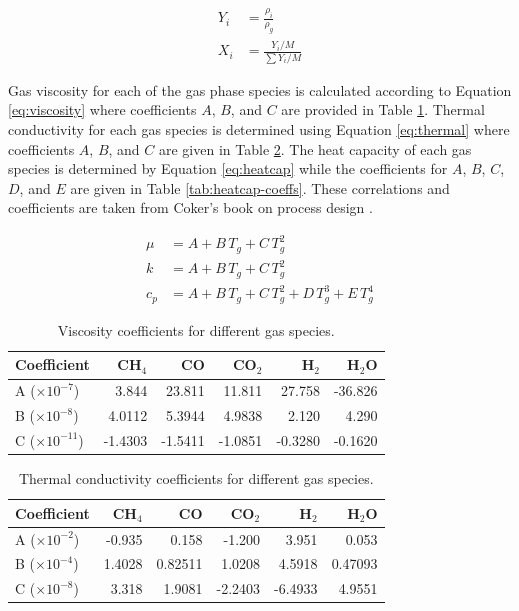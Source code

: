 \documentclass[12pt,titlepage]{article}
\begin{document}
\begin{align}
    Y_i &= \frac{\rho_i}{\rho_g} \label{eq:massfrac} \\
    X_i &= \frac{Y_i / M}{\sum Y_i / M} \label{eq:molefrac}
\end{align}

Gas viscosity for each of the gas phase species is calculated according to Equation \ref{eq:viscosity} where coefficients $A$, $B$, and $C$ are provided in Table \ref{tab:visc-coeffs}. Thermal conductivity for each gas species is determined using Equation \ref{eq:thermal} where coefficients $A$, $B$, and $C$ are given in Table \ref{tab:thermal-coeffs}. The heat capacity of each gas species is determined by Equation \ref{eq:heatcap} while the coefficients for $A$, $B$, $C$, $D$, and $E$ are given in Table \ref{tab:heatcap-coeffs}. These correlations and coefficients are taken from Coker's book on process design \cite{Coker-2007}.

\begin{align}
    \mu &= A + B\,T_g + C\,T_g^2 \label{eq:viscosity} \\
    k &= A + B\,T_g + C\,T_g^2 \label{eq:thermal} \\
    c_p &= A + B\,T_g + C\,T_g^2 + D\,T_g^3 + E\,T_g^4 \label{eq:heatcap}
\end{align}

\begin{table}[ht]
    \caption{Viscosity coefficients for different gas species.}
    \label{tab:visc-coeffs}
    \centering
    \begin{tabular}{lrrrrr}
        \toprule
        Coefficient & CH$_4$ & CO & CO$_2$ & H$_2$ & H$_2$O \\
        \midrule
        A ($\times10^{-7}$) & 3.844 & 23.811 & 11.811 & 27.758 & -36.826 \\
        B ($\times10^{-8}$) & 4.0112 & 5.3944 & 4.9838 & 2.120 & 4.290 \\
        C ($\times10^{-11}$) & -1.4303 & -1.5411 & -1.0851 & -0.3280 & -0.1620 \\
        \bottomrule
    \end{tabular}
\end{table}

\begin{table}[ht]
    \caption{Thermal conductivity coefficients for different gas species.}
    \label{tab:thermal-coeffs}
    \centering
    \begin{tabular}{lrrrrr}
        \toprule
        Coefficient & CH$_4$ & CO & CO$_2$ & H$_2$ & H$_2$O \\
        \midrule
        A ($\times10^{-2}$) & -0.935 & 0.158 & -1.200 & 3.951 & 0.053 \\
        B ($\times10^{-4}$) & 1.4028 & 0.82511 & 1.0208 & 4.5918 & 0.47093 \\
        C ($\times10^{-8}$) & 3.318 & 1.9081 & -2.2403 & -6.4933 & 4.9551 \\
        \bottomrule
    \end{tabular}
\end{table}
\end{document}
